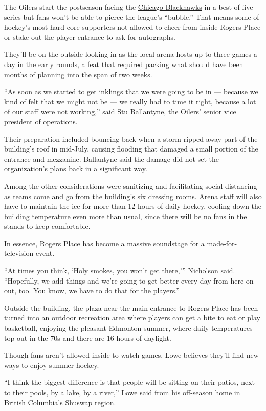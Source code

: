 The Oilers start the postseason facing the
\href{https://www.nytimes.com/2020/07/07/sports/hockey/chicago-blackhawks-stand-by-logo.html}{Chicago
Blackhawks} in a best-of-five series but fans won't be able to pierce
the league's ``bubble.'' That means some of hockey's most hard-core
supporters not allowed to cheer from inside Rogers Place or stake out
the player entrance to ask for autographs.

They'll be on the outside looking in as the local arena hosts up to
three games a day in the early rounds, a feat that required packing what
should have been months of planning into the span of two weeks.

``As soon as we started to get inklings that we were going to be in ---
because we kind of felt that we might not be --- we really had to time
it right, because a lot of our staff were not working,'' said Stu
Ballantyne, the Oilers' senior vice president of operations.

Their preparation included bouncing back when a storm ripped away part
of the building's roof in mid-July, causing flooding that damaged a
small portion of the entrance and mezzanine. Ballantyne said the damage
did not set the organization's plans back in a significant way.

Among the other considerations were sanitizing and facilitating social
distancing as teams come and go from the building's six dressing rooms.
Arena staff will also have to maintain the ice for more than 12 hours of
daily hockey, cooling down the building temperature even more than
usual, since there will be no fans in the stands to keep comfortable.

In essence, Rogers Place has become a massive soundstage for a
made-for-television event.

``At times you think, `Holy smokes, you won't get there,''' Nicholson
said. ``Hopefully, we add things and we're going to get better every day
from here on out, too. You know, we have to do that for the players.''

Outside the building, the plaza near the main entrance to Rogers Place
has been turned into an outdoor recreation area where players can get a
bite to eat or play basketball, enjoying the pleasant Edmonton summer,
where daily temperatures top out in the 70s and there are 16 hours of
daylight.

Though fans aren't allowed inside to watch games, Lowe believes they'll
find new ways to enjoy summer hockey.

``I think the biggest difference is that people will be sitting on their
patios, next to their pools, by a lake, by a river,'' Lowe said from his
off-season home in British Columbia's Shuswap region.

